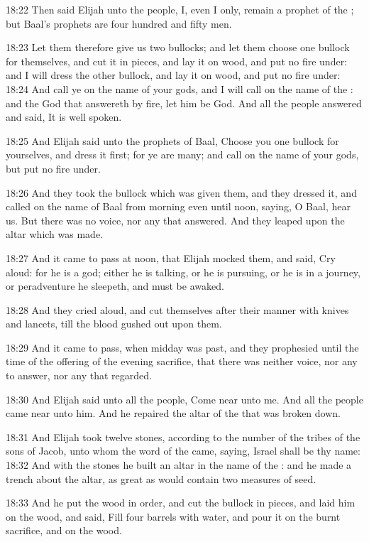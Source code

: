 18:22 Then said Elijah unto the people, I, even I only, remain a
prophet of the \LORD; but Baal's prophets are four hundred and fifty
men.

18:23 Let them therefore give us two bullocks; and let them choose one
bullock for themselves, and cut it in pieces, and lay it on wood, and
put no fire under: and I will dress the other bullock, and lay it on
wood, and put no fire under: 18:24 And call ye on the name of your
gods, and I will call on the name of the \LORD: and the God that
answereth by fire, let him be God. And all the people answered and
said, It is well spoken.

18:25 And Elijah said unto the prophets of Baal, Choose you one
bullock for yourselves, and dress it first; for ye are many; and call
on the name of your gods, but put no fire under.

18:26 And they took the bullock which was given them, and they dressed
it, and called on the name of Baal from morning even until noon,
saying, O Baal, hear us. But there was no voice, nor any that
answered. And they leaped upon the altar which was made.

18:27 And it came to pass at noon, that Elijah mocked them, and said,
Cry aloud: for he is a god; either he is talking, or he is pursuing,
or he is in a journey, or peradventure he sleepeth, and must be
awaked.

18:28 And they cried aloud, and cut themselves after their manner with
knives and lancets, till the blood gushed out upon them.

18:29 And it came to pass, when midday was past, and they prophesied
until the time of the offering of the evening sacrifice, that there
was neither voice, nor any to answer, nor any that regarded.

18:30 And Elijah said unto all the people, Come near unto me. And all
the people came near unto him. And he repaired the altar of the \LORD
that was broken down.

18:31 And Elijah took twelve stones, according to the number of the
tribes of the sons of Jacob, unto whom the word of the \LORD came,
saying, Israel shall be thy name: 18:32 And with the stones he built
an altar in the name of the \LORD: and he made a trench about the
altar, as great as would contain two measures of seed.

18:33 And he put the wood in order, and cut the bullock in pieces, and
laid him on the wood, and said, Fill four barrels with water, and pour
it on the burnt sacrifice, and on the wood.

